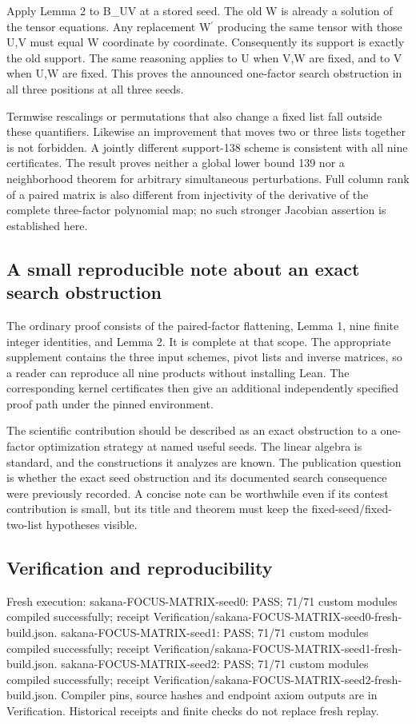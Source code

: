 \documentclass[11pt,a4paper]{article}
\begin{document}
Apply Lemma 2 to B\_UV at a stored seed. The old W is already a solution of the tensor equations. Any replacement W\ensuremath{^{\prime}} producing the same tensor with those U,V must equal W coordinate by coordinate. Consequently its support is exactly the old support. The same reasoning applies to U when V,W are fixed, and to V when U,W are fixed. This proves the announced one-factor search obstruction in all three positions at all three seeds.

Termwise rescalings or permutations that also change a fixed list fall outside these quantifiers. Likewise an improvement that moves two or three lists together is not forbidden. A jointly different support-138 scheme is consistent with all nine certificates. The result proves neither a global lower bound 139 nor a neighborhood theorem for arbitrary simultaneous perturbations. Full column rank of a paired matrix is also different from injectivity of the derivative of the complete three-factor polynomial map; no such stronger Jacobian assertion is established here.

\subsection{A small reproducible note about an exact search obstruction}
The ordinary proof consists of the paired-factor flattening, Lemma 1, nine finite integer identities, and Lemma 2. It is complete at that scope. The appropriate supplement contains the three input schemes, pivot lists and inverse matrices, so a reader can reproduce all nine products without installing Lean. The corresponding kernel certificates then give an additional independently specified proof path under the pinned environment.

The scientific contribution should be described as an exact obstruction to a one-factor optimization strategy at named useful seeds. The linear algebra is standard, and the constructions it analyzes are known. The publication question is whether the exact seed obstruction and its documented search consequence were previously recorded. A concise note can be worthwhile even if its contest contribution is small, but its title and theorem must keep the fixed-seed/fixed-two-list hypotheses visible.

\subsection{Verification and reproducibility}
Fresh execution: sakana-FOCUS-MATRIX-seed0: PASS; 71/71 custom modules compiled successfully; receipt Verification/sakana-FOCUS-MATRIX-seed0-fresh-build.json. sakana-FOCUS-MATRIX-seed1: PASS; 71/71 custom modules compiled successfully; receipt Verification/sakana-FOCUS-MATRIX-seed1-fresh-build.json. sakana-FOCUS-MATRIX-seed2: PASS; 71/71 custom modules compiled successfully; receipt Verification/sakana-FOCUS-MATRIX-seed2-fresh-build.json. Compiler pins, source hashes and endpoint axiom outputs are in Verification. Historical receipts and finite checks do not replace fresh replay.
\end{document}
